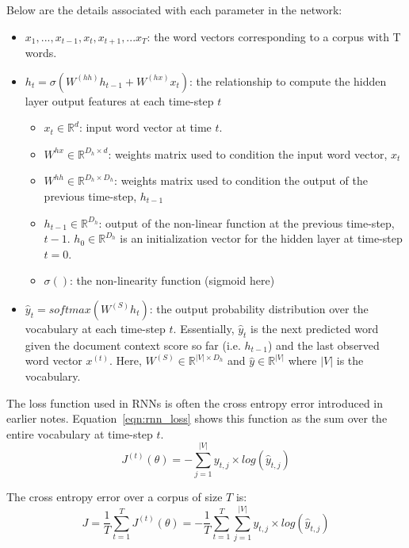 \documentclass{tufte-handout}
\begin{document}
Below are the details associated with each parameter in the network:
\begin{itemize}
	\item $x_1, ..., x_{t-1}, x_t, x_{t+1}, ... x_{T}$: the word vectors corresponding to a corpus with T words.
	\item $h_t = \sigma(W^{(hh)} h_{t-1} + W^{(hx)} x_{t})$: the relationship to compute the hidden layer output features at each time-step $t$
	\begin{itemize}
		\item $x_{t} \in \mathbb{R}^{d}$: input word vector at time $t$.
		\item $W^{hx} \in \mathbb{R}^{D_h \times d}$: weights matrix used to condition the input word vector, $x_t$
		\item $W^{hh} \in \mathbb{R}^{D_h \times D_h}$: weights matrix used to condition the output of the previous time-step, $h_{t-1}$
		\item $h_{t-1}  \in \mathbb{R}^{D_h}$: output of the non-linear function at the previous time-step, $t-1$. $h_0 \in \mathbb{R}^{D_h}$ is an initialization vector for the hidden layer at time-step $t = 0$.
		\item $\sigma ()$: the non-linearity function (sigmoid here)
	\end{itemize}
	\item $\hat{y}_t = softmax (W^{(S)}h_t)$: the output probability distribution over the vocabulary at each time-step $t$. Essentially, $\hat{y}_t$ is the next predicted word given the document context score so far (i.e. $h_{t-1}$) and the last observed word vector $x^{(t)}$. Here, $W^{(S)} \in \mathbb{R}^{|V| \times D_h}$ and $\hat{y} \in \mathbb{R}^{|V|}$ where $|V|$ is the vocabulary.
\end{itemize}

The loss function used in RNNs is often the cross entropy error introduced in earlier notes. Equation~\ref{eqn:rnn_loss} shows this function as the sum over the entire vocabulary at time-step $t$.
\begin{equation}
	J^{(t)}(\theta) = - \sum_{j=1}^{|V|} y_{t,j} \times log (\hat{y}_{t,j})
	\label {eqn:rnn_loss}
\end{equation}

The cross entropy error over a corpus of size $T$ is:
\begin{equation}
	J = \dfrac{1}{T} \sum_{t=1}^{T} J^{(t)}(\theta) = - \dfrac{1}{T} \sum_{t=1}^{T} \sum_{j=1}^{|V|} y_{t,j} \times log (\hat{y}_{t,j})
	\label {eqn:rnn_loss_T}
\end{equation}
\end{document}
